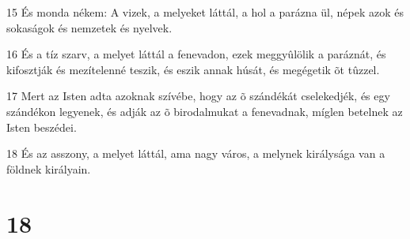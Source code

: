\par 15 És monda nékem: A vizek, a melyeket láttál, a hol a parázna ül, népek  azok és sokaságok és nemzetek és nyelvek.
\par 16 És a tíz szarv, a melyet láttál a fenevadon, ezek meggyûlölik a paráznát, és kifosztják és mezítelenné teszik, és eszik annak húsát, és megégetik  õt tûzzel.
\par 17 Mert az Isten adta azoknak szívébe, hogy az õ szándékát cselekedjék, és egy szándékon legyenek, és adják az õ birodalmukat a fenevadnak, míglen betelnek az Isten beszédei.
\par 18 És az asszony, a melyet láttál, ama nagy  város, a melynek királysága van a földnek királyain.

\chapter{18}

